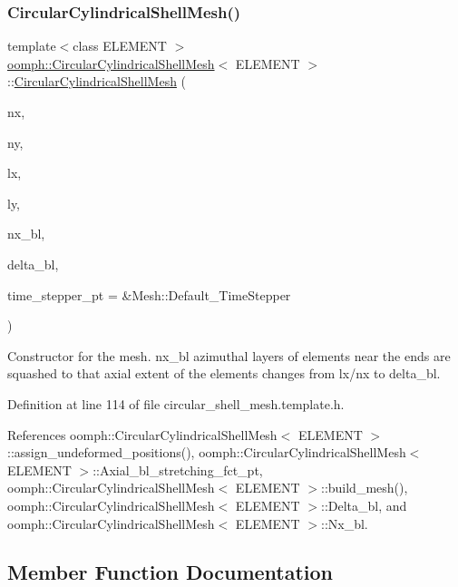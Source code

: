 \subsubsection{\texorpdfstring{Circular\+Cylindrical\+Shell\+Mesh()}{CircularCylindricalShellMesh()}\hspace{0.1cm}{\footnotesize\ttfamily [3/3]}}
{\footnotesize\ttfamily template$<$class E\+L\+E\+M\+E\+NT $>$ \\
\hyperlink{classoomph_1_1CircularCylindricalShellMesh}{oomph\+::\+Circular\+Cylindrical\+Shell\+Mesh}$<$ E\+L\+E\+M\+E\+NT $>$\+::\hyperlink{classoomph_1_1CircularCylindricalShellMesh}{Circular\+Cylindrical\+Shell\+Mesh} (\begin{DoxyParamCaption}\item[{const unsigned \&}]{nx,  }\item[{const unsigned \&}]{ny,  }\item[{const double \&}]{lx,  }\item[{const double \&}]{ly,  }\item[{const unsigned \&}]{nx\+\_\+bl,  }\item[{const double \&}]{delta\+\_\+bl,  }\item[{Time\+Stepper $\ast$}]{time\+\_\+stepper\+\_\+pt = {\ttfamily \&Mesh\+:\+:Default\+\_\+TimeStepper} }\end{DoxyParamCaption})\hspace{0.3cm}{\ttfamily [inline]}}



Constructor for the mesh. nx\+\_\+bl azimuthal layers of elements near the ends are squashed to that axial extent of the elements changes from lx/nx to delta\+\_\+bl. 



Definition at line 114 of file circular\+\_\+shell\+\_\+mesh.\+template.\+h.



References oomph\+::\+Circular\+Cylindrical\+Shell\+Mesh$<$ E\+L\+E\+M\+E\+N\+T $>$\+::assign\+\_\+undeformed\+\_\+positions(), oomph\+::\+Circular\+Cylindrical\+Shell\+Mesh$<$ E\+L\+E\+M\+E\+N\+T $>$\+::\+Axial\+\_\+bl\+\_\+stretching\+\_\+fct\+\_\+pt, oomph\+::\+Circular\+Cylindrical\+Shell\+Mesh$<$ E\+L\+E\+M\+E\+N\+T $>$\+::build\+\_\+mesh(), oomph\+::\+Circular\+Cylindrical\+Shell\+Mesh$<$ E\+L\+E\+M\+E\+N\+T $>$\+::\+Delta\+\_\+bl, and oomph\+::\+Circular\+Cylindrical\+Shell\+Mesh$<$ E\+L\+E\+M\+E\+N\+T $>$\+::\+Nx\+\_\+bl.



\subsection{Member Function Documentation}
\mbox{\label{classoomph_1_1CircularCylindricalShellMesh_a03bba13301e4dec893d73716e146c71d}} 
